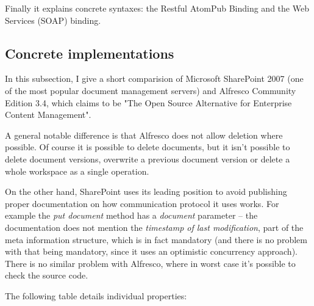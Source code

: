 Finally it explains concrete syntaxes: the Restful AtomPub Binding and the Web
Services (SOAP) binding.

\subsection{Concrete implementations}

In this subsection, I give a short comparision of Microsoft SharePoint 2007 (one of
the most popular document management servers) and Alfresco Community Edition 3.4, which claims to be
"The Open Source Alternative for Enterprise Content Management".

A general notable difference is that Alfresco does not allow deletion where
possible. Of course it is possible to delete documents, but it isn't possible
to delete document versions, overwrite a previous document version or delete a
whole workspace as a single operation.

On the other hand, SharePoint uses its leading position to avoid publishing
proper documentation on how communication protocol it uses works. For example
the \emph{put document} method has a \emph{document} parameter -- the
documentation\cite{spdoc} does not mention the \emph{timestamp of last
modification}, part of the meta information structure, which is in fact
mandatory (and there is no problem with that being mandatory, since it uses an
optimistic concurrency approach). There is no similar problem with Alfresco,
where in worst case it's possible to check the source code.

The following table details individual properties:

